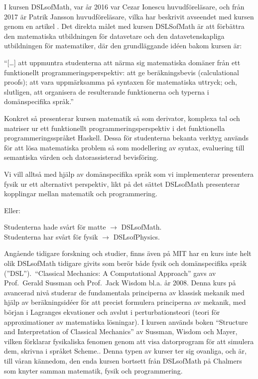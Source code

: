 \begin{draft}
I kursen DSLsofMath, var år 2016 var Cezar Ionescu huvudföreläsare, och från 2017 är Patrik Jansson
huvudföreläsare, vilka har beskrivit avseendet med kursen genom en artikel \cite{tfpie2015}. Det direkta målet 
med kursen DSLSofMath är att förbättra den matematiska utbildningen för datavetare och den
datavetenskapliga utbildningen för matematiker, där den grundläggande idéen bakom kursen är: 

\begin{center}
  ``[\dots] att uppmuntra studenterna att närma sig matematiska domäner från ett
  funktionellt programmeringsperspektiv: att ge beräkningsbevis (calculational
  proofs); att vara uppmärksamma på syntaxen för matematiska uttryck; och,
  slutligen, att organisera de resulterande funktionerna och typerna i
  domänspecifika språk.''\cite{lecture-notes}\cite{tfpie2015} 
\end{center}

Konkret så presenterar kursen matematik så som derivator, komplexa
tal och matriser ur ett funktionellt programmeringsperspektiv i det funktionella programmeringsspråket
Haskell. Dessa för studenterna bekanta verktyg används för att lösa
matematiska problem så som modellering av syntax, evaluering till
semantiska värden och datorassisterad bevisföring.

Vi vill alltså med hjälp av domänspecifika språk som vi implementerar presentera fysik ur ett alternativt perspektiv, likt
på det sättet DSLsofMath presenterar kopplingar mellan matematik och programmering.

Eller:

Studenterna hade svårt för matte $\rightarrow $ DSLsofMath.\\
Studenterna har svårt för fysik $\rightarrow $ DSLsofPhysics.


Angående tidigare forskning och studier, finns även på MIT har en kurs inte helt olik DSLsofMath tidigare givits som berör både
fysik och domänspecifika språk (''DSL'').\ ``Classical Mechanics: A Computational Approach'' gavs av
Prof.\ Gerald Sussman och Prof.\ Jack Wisdom bl.a. år
2008.\cite{classical-mechanics-course-mit-2008}
Denna kurs på avancerad nivå studerar de fundamentala principerna av klassisk
mekanik med hjälp av beräkningsidéer för att precist formulera principerna av
mekanik, med början i Lagranges ekvationer och avslut i
perturbationsteori (teori för approximationer av matematiska lösningar). I kursen används boken ``Structure and %
Interpretation of Classical Mechanics'' av Sussman, Wisdom och Mayer,
vilken förklarar fysikaliska fenomen genom att visa datorprogram för att
simulera dem, skrivna i språket Scheme.\cite{SICM}. Denna typen av kurser ter sig ovanliga, och är, till våran kännedom, den enda kursen bortsett från DSLsofMath på Chalmers som knyter samman matematik, fysik och programmering.


\end{draft}
